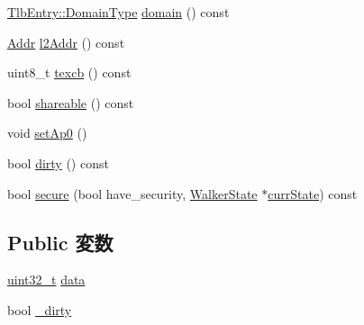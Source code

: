 \begin{DoxyCompactItemize}
\item 
\hyperlink{structArmISA_1_1TlbEntry_a0595b41cfb7d03f18438f9c355a3469d}{TlbEntry::DomainType} \hyperlink{classArmISA_1_1TableWalker_1_1L1Descriptor_a949a36eac4ce1b6aa2afd933e7e74710}{domain} () const 
\item 
\hyperlink{classm5_1_1params_1_1Addr}{Addr} \hyperlink{classArmISA_1_1TableWalker_1_1L1Descriptor_ad41ce35ecb10e8814bcc8829ad89a508}{l2Addr} () const 
\item 
uint8\_\-t \hyperlink{classArmISA_1_1TableWalker_1_1L1Descriptor_a2f3e1adbe4ca1fa91c6c12f35828dd73}{texcb} () const 
\item 
bool \hyperlink{classArmISA_1_1TableWalker_1_1L1Descriptor_a9b831498b02d6b485c2b15f33ccd0582}{shareable} () const 
\item 
void \hyperlink{classArmISA_1_1TableWalker_1_1L1Descriptor_ae309fe90579f95e8236119ad4e4b89c6}{setAp0} ()
\item 
bool \hyperlink{classArmISA_1_1TableWalker_1_1L1Descriptor_ade104a269a8f8f3ef5ded192aede7991}{dirty} () const 
\item 
bool \hyperlink{classArmISA_1_1TableWalker_1_1L1Descriptor_a183500f0404847b8d9ea66ef3cba6ca5}{secure} (bool have\_\-security, \hyperlink{classArmISA_1_1TableWalker_1_1WalkerState}{WalkerState} $\ast$\hyperlink{classArmISA_1_1TableWalker_a5d1a85a0248e318a8191d54988c8782d}{currState}) const 
\end{DoxyCompactItemize}
\subsection*{Public 変数}
\begin{DoxyCompactItemize}
\item 
\hyperlink{Type_8hh_a435d1572bf3f880d55459d9805097f62}{uint32\_\-t} \hyperlink{classArmISA_1_1TableWalker_1_1L1Descriptor_a1e43bf7d608e87228b625cca2c04d641}{data}
\item 
bool \hyperlink{classArmISA_1_1TableWalker_1_1L1Descriptor_ad9d7d92a6dc33a9bf186020af3053844}{\_\-dirty}
\end{DoxyCompactItemize}


